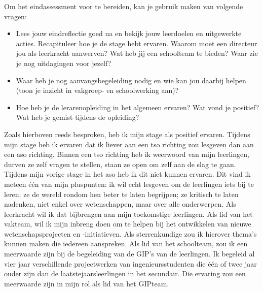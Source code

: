 \documentclass[a4paper,12pt,twoside]{article}%
\begin{document}
Om het eindassessment voor te bereiden, kan je gebruik maken van volgende vragen:
\begin{itemize}
	\item Lees jouw eindreflectie goed na en bekijk jouw leerdoelen en uitgewerkte acties. Recapituleer hoe je de stage hebt ervaren. Waarom moet een directeur jou als leerkracht aanwerven? Wat heb jij een schoolteam te bieden? Waar zie je nog uitdagingen voor jezelf? 
	\item Waar heb je nog aanvangsbegeleiding nodig en wie kan jou daarbij helpen (toon je inzicht in vakgroep- en schoolwerking aan)?
	\item Hoe heb je de lerarenopleiding in het algemeen ervaren? Wat vond je positief? Wat heb je gemist tijdens de opleiding?
\end{itemize} 

Zoals hierboven reeds besproken, heb ik mijn stage als positief ervaren. Tijdens mijn stage heb ik ervaren dat ik liever aan een tso richting zou lesgeven dan aan een aso richting. Binnen een tso richting heb ik weerwoord van mijn leerlingen, durven ze zelf vragen te stellen, staan ze open om zelf aan de slag te gaan. Tijdens mijn vorige stage in het aso heb ik dit niet kunnen ervaren.\newline\newline
Dit vind ik meteen één van mijn pluspunten: ik wil echt lesgeven om de leerlingen iets bij te leren; ze de wereld rondom hen beter te laten begrijpen; ze kritisch te laten nadenken, niet enkel over wetenschappen, maar over alle onderwerpen. Als leerkracht wil ik dat bijbrengen aan mijn toekomstige leerlingen. \newline
Als lid van het vakteam, wil ik mijn inbreng doen om te helpen bij het ontwikkelen van nieuwe wetenschapsprojecten en -initiatieven. Als sterrenkundige zou ik hierover thema's kunnen maken die iedereen aanspreken. Als lid van het schoolteam, zou ik een meerwaarde zijn bij de begeleiding van de GIP's van de leerlingen. Ik begeleid al vier jaar verschillende projectwerken van ingenieursstudenten die één of twee jaar ouder zijn dan de laatstejaarsleerlingen in het secundair. Die ervaring zou een meerwaarde zijn in mijn rol als lid van het GIPteam.






	
	
	
\end{document}
